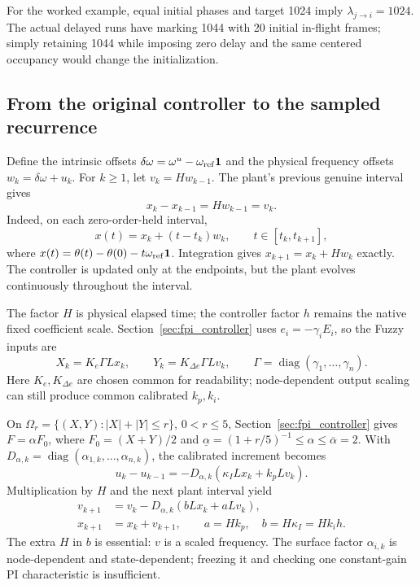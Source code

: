 For the worked example, equal initial phases and target 1024 imply
$\lambda_{j\to i}=1024$. The actual delayed runs have marking 1044 with
20 initial in-flight frames; simply retaining 1044 while imposing zero
delay and the same centered occupancy would change the initialization.

\subsection{From the original controller to the sampled recurrence}

Define the intrinsic offsets $\delta\omega=\omega^u-\omega_{\rm ref}\mathbf1$
and the physical frequency offsets $w_k=\delta\omega+u_k$. For $k\ge1$,
let $v_k=Hw_{k-1}$. The plant's previous genuine interval gives
\begin{equation}
 x_k-x_{k-1}=Hw_{k-1}=v_k.
 \label{eq:btd_d_plant}
\end{equation}
Indeed, on each zero-order-held interval,
\begin{equation}
 x(t)=x_k+(t-t_k)w_k,\qquad t\in[t_k,t_{k+1}],
 \label{eq:btd_exact_continuous_flow}
\end{equation}
where $x(t)=\theta(t)-\theta(0)-t\omega_{\rm ref}\mathbf1$.
Integration gives $x_{k+1}=x_k+Hw_k$ exactly. The controller is updated
only at the endpoints, but the plant evolves continuously throughout
the interval.

The factor $H$ is physical elapsed time; the controller factor $h$ remains
the native fixed coefficient scale. Section~\ref{sec:fpi_controller} uses
$e_i=-\gamma_i E_i$, so the Fuzzy inputs are
\begin{equation}
 X_k=K_e\Gamma Lx_k,\qquad
 Y_k=K_{\Delta e}\Gamma Lv_k,\qquad
 \Gamma=\operatorname{diag}(\gamma_1,\ldots,\gamma_n).
 \label{eq:btd_d_inputs}
\end{equation}
Here $K_e,K_{\Delta e}$ are chosen common for readability; node-dependent
output scaling can still produce common calibrated $k_p,k_i$.

On $\Omega_r=\{(X,Y):|X|+|Y|\le r\}$, $0<r\le5$, Section~\ref{sec:fpi_controller} gives
$F=\alpha F_0$, where $F_0=(X+Y)/2$ and
$\underline\alpha=(1+r/5)^{-1}\le\alpha\le\overline\alpha=2$.
With $D_{\alpha,k}=\operatorname{diag}(\alpha_{1,k},\ldots,\alpha_{n,k})$,
the calibrated increment becomes
\begin{equation}
 u_k-u_{k-1}=-D_{\alpha,k}(\kappa_I Lx_k+k_pLv_k).
 \label{eq:btd_d_command_increment}
\end{equation}
Multiplication by $H$ and the next plant interval yield
\begin{align}
 v_{k+1}&=v_k-D_{\alpha,k}(bLx_k+aLv_k),\nonumber\\
 x_{k+1}&=x_k+v_{k+1},\qquad
 a=Hk_p,\quad b=H\kappa_I=Hk_i h.
 \label{eq:btd_full_recurrence}
\end{align}
The extra $H$ in $b$ is essential: $v$ is a scaled frequency. The surface
factor $\alpha_{i,k}$ is node-dependent and state-dependent; freezing it
and checking one constant-gain PI characteristic is insufficient.

